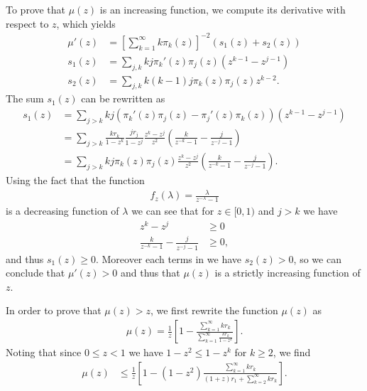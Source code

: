 \documentclass[a4paper]{article}
\begin{document}
To prove that $\mu(z)$ is an increasing function, we compute its derivative with respect to $z$, which yields
\begin{align}
	\mu'(z) &= \left[\sum_{k = 1}^{\infty}k \pi_k(z)\right]^{-2} \left(s_1(z) + s_2(z)\right) \\
	s_1(z) &= \sum_{j, k}k j \pi_k'(z) \pi_j(z) \left( z^{k-1} -  z^{j-1}\right) \\
	s_2(z) &= \sum_{j, k} k (k - 1) j \pi_k(z) \pi_j(z) z^{k-2}.
\end{align}
The sum $s_1(z)$ can be rewritten as
\begin{align}
	s_1(z) &= \sum_{j > k} k j \left(\pi_k'(z) \pi_j(z) - \pi_j'(z) \pi_k(z)\right) \left(z^{k-1} -  z^{j-1}\right) \\
		&=\sum_{j > k} \frac{k r_k}{1 - z^k} \frac{j r_j}{1 - z^j} \frac{z^k - z^j}{z^2} \left(\frac{k}{z^{-k} - 1} - \frac{j}{z^{-j} - 1}\right)\\
		&=\sum_{j > k} k j \pi_k(z) \pi_j(z) \frac{z^k - z^j}{z^2} \left(\frac{k}{z^{-k} - 1} - \frac{j}{z^{-j} - 1}\right).
\end{align}
Using the fact that the function
\begin{align}
	f_z(\lambda) = \frac{\lambda}{z^{-\lambda} - 1}
\end{align}
is a decreasing function of $\lambda$ we can see that for $z \in [0, 1)$ and $j > k$ we have
\begin{align}
	z^k - z^j &\geq 0 \\
	\frac{k}{z^{-k} - 1} - \frac{j}{z^{-j} - 1} &\geq 0,
\end{align}
and thus $s_1(z) \geq 0$. Moreover each terms in we have $s_2(z) > 0$, so we can conclude that $\mu'(z) > 0$ and thus that $\mu(z)$ is a strictly increasing function of $z$.

In order to prove that $\mu(z) > z$, we first rewrite the function $\mu(z)$ as
\begin{align}
	\mu(z) = \frac{1}{z} \left[1 - \frac{\sum_{k=1}^\infty k r_k}{\sum_{k=1}^\infty \frac{k r_k}{1 - z^k}}\right].
\end{align}
Noting that since $0 \leq z < 1$ we have $1 - z^2 \leq 1 - z^k$ for $k \geq 2$, we find
\begin{align}
	\mu(z) &\leq \frac{1}{z} \left[1 - (1 - z^2)\frac{\sum_{k=1}^\infty k r_k}{(1 + z)r_1 + \sum_{k=2}^\infty k r_k}\right].
\end{align}

\printbibliography{}
\end{document}
